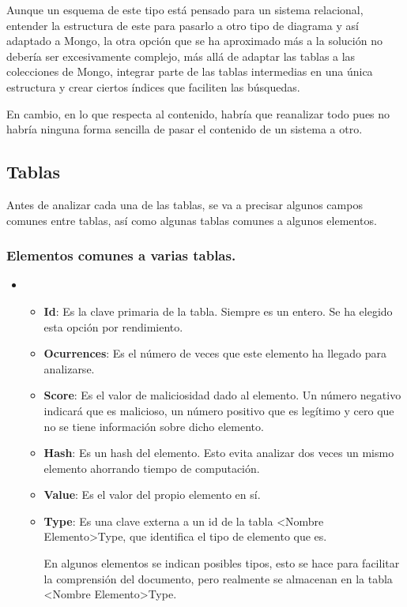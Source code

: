 Aunque un esquema de este tipo está pensado para un sistema relacional, entender la estructura de este para pasarlo a otro tipo de diagrama y así adaptado a Mongo, la otra opción que se ha aproximado más a la solución no debería ser excesivamente complejo, más allá de adaptar las tablas a las colecciones de Mongo, integrar parte de las tablas intermedias en una única estructura y crear ciertos índices que faciliten las búsquedas.

En cambio, en lo que respecta al contenido, habría que reanalizar todo pues no habría ninguna forma sencilla de pasar el contenido de un sistema a otro. 

\subsection{Tablas}
Antes de analizar cada una de las tablas, se va a precisar algunos campos comunes entre tablas, así como algunas tablas comunes a algunos elementos. 
\subsubsection{Elementos comunes a varias tablas.}
\begin{itemize}
    \item[] 
    \begin{itemize}
        \item \textbf{Id}: Es la clave primaria de la tabla. Siempre es un entero. Se ha elegido esta opción por rendimiento. 
        \item \textbf{Ocurrences}: Es el número de veces que este elemento ha llegado para analizarse.
        \item \textbf{Score}: Es el valor de maliciosidad dado al elemento. Un número negativo indicará que es malicioso, un número positivo que es legítimo y cero que no se tiene información sobre dicho elemento. 
        \item \textbf{Hash}: Es un hash del elemento. Esto evita analizar dos veces un mismo elemento ahorrando tiempo de computación.  
        \item \textbf{Value}: Es el valor del propio elemento en sí.
        \item \textbf{Type}: Es una clave externa a un id de la tabla <Nombre Elemento>Type, que identifica el tipo de elemento que es. 
        
        En algunos elementos se indican posibles tipos, esto se hace para facilitar la comprensión del documento, pero realmente se almacenan en la tabla <Nombre Elemento>Type.
    \end{itemize}
\end{itemize}

